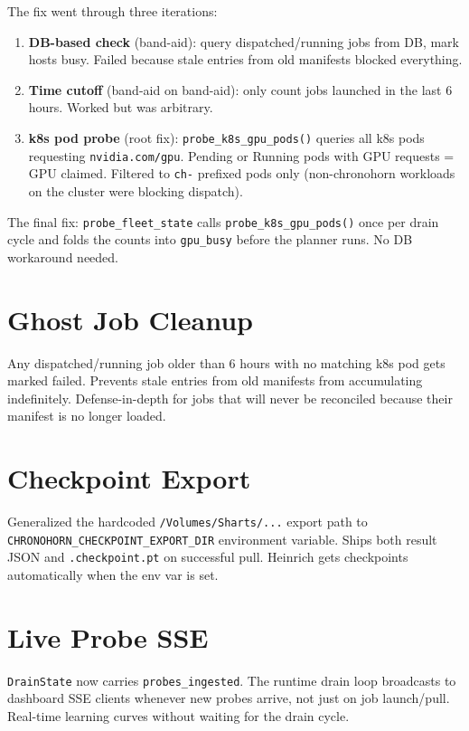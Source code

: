 \documentclass[11pt,a4paper]{report}
\begin{document}
The fix went through three iterations:

\begin{enumerate}[nosep]
\item \textbf{DB-based check} (band-aid): query dispatched/running jobs from DB, mark hosts busy. Failed because stale entries from old manifests blocked everything.
\item \textbf{Time cutoff} (band-aid on band-aid): only count jobs launched in the last 6 hours. Worked but was arbitrary.
\item \textbf{k8s pod probe} (root fix): \texttt{probe\_k8s\_gpu\_pods()} queries all k8s pods requesting \texttt{nvidia.com/gpu}. Pending or Running pods with GPU requests = GPU claimed. Filtered to \texttt{ch-} prefixed pods only (non-chronohorn workloads on the cluster were blocking dispatch).
\end{enumerate}

The final fix: \texttt{probe\_fleet\_state} calls \texttt{probe\_k8s\_gpu\_pods()} once per drain cycle and folds the counts into \texttt{gpu\_busy} before the planner runs. No DB workaround needed.

\section{Ghost Job Cleanup}

Any dispatched/running job older than 6 hours with no matching k8s pod gets marked failed. Prevents stale entries from old manifests from accumulating indefinitely. Defense-in-depth for jobs that will never be reconciled because their manifest is no longer loaded.

\section{Checkpoint Export}

Generalized the hardcoded \texttt{/Volumes/Sharts/...} export path to \texttt{CHRONOHORN\_CHECKPOINT\_EXPORT\_DIR} environment variable. Ships both result JSON and \texttt{.checkpoint.pt} on successful pull. Heinrich gets checkpoints automatically when the env var is set.

\section{Live Probe SSE}

\texttt{DrainState} now carries \texttt{probes\_ingested}. The runtime drain loop broadcasts to dashboard SSE clients whenever new probes arrive, not just on job launch/pull. Real-time learning curves without waiting for the drain cycle.
\end{document}
